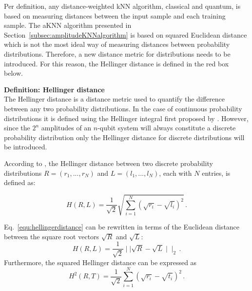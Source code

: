Per definition, any distance-weighted kNN algorithm, classical and quantum, is based on measuring distances between the input sample and each training sample. The aKNN algorithm presented in Section~\ref{subsec:amplitudeKNNalgorithm} is based on squared Euclidean distance which is not the most ideal way of measuring distances between probability distributions. Therefore, a new distance metric for distributions needs to be introduced. For this reason, the Hellinger distance is defined in the red box below.

\begin{redbox}
\textbf{Definition: Hellinger distance}\\
\newline
The Hellinger distance is a distance metric used to quantify the difference between any two probability distributions. In the case of continuous probability distributions it is defined using the Hellinger integral first proposed by . However, since the $2^n$ amplitudes of an $n$-qubit system will always constitute a discrete probability distribution only the Hellinger distance for discrete distributions will be introduced.

According to , the Hellinger distance between two discrete probability distributions $R = (r_1,...,r_N)$ and $L = (l_1,...,l_N)$, each with $N$ entries, is defined as:

\begin{equation}
\label{equ:hellingerdistance}
H(R,L) = \frac{1}{\sqrt{2}}\sqrt{\sum_{i=1}^N (\sqrt{r_i} - \sqrt{l_i})^2}\, .
\end{equation}
\end{redbox}
\begin{redbox}
Eq.~\ref{equ:hellingerdistance} can be rewritten in terms of the Euclidean distance between the square root vectors $\sqrt{R}$ and $\sqrt{L}$:
\begin{equation}
\label{equ:hellingereuclidean}
H(R,L) = \frac{1}{\sqrt{2}} \mid\mid\sqrt{R} - \sqrt{L}\mid\mid_2\, .
\end{equation}
Furthermore, the squared Hellinger distance can be expressed as
\begin{equation}
\label{equ:squaredhellingerdistance}
H^2(R,T) = \frac{1}{\sqrt{2}}\sum_{i=1}^N (\sqrt{r_i} - \sqrt{t_i})^2\, .
\end{equation}
\end{redbox}

